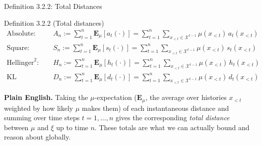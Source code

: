 \documentclass[aspectratio=169,10pt]{beamer}
\newcommand{\X}{\mathcal{X}}
\begin{document}
\begin{frame}{Definition 3.2.2: Total Distances}
  \begin{block}{Definition 3.2.2 (Total distances)}
    \begin{align*}
      \text{Absolute:} \quad & A_n := \sum_{t=1}^{n}\mathbf{E}_\mu[a_t(\cdot)] = \sum_{t=1}^{n}\sum_{x_{<t}\in\X^{t-1}} \mu(x_{<t})\,a_t(x_{<t}) \\
      \text{Square:} \quad & S_n := \sum_{t=1}^{n}\mathbf{E}_\mu[s_t(\cdot)] = \sum_{t=1}^{n}\sum_{x_{<t}\in\X^{t-1}} \mu(x_{<t})\,s_t(x_{<t}) \\
      \text{Hellinger}^2\text{:} \quad & H_n := \sum_{t=1}^{n}\mathbf{E}_\mu[h_t(\cdot)] = \sum_{t=1}^{n}\sum_{x_{<t}\in\X^{t-1}} \mu(x_{<t})\,h_t(x_{<t}) \\
      \text{KL divergence:} \quad & D_n := \sum_{t=1}^{n}\mathbf{E}_\mu[d_t(\cdot)] = \sum_{t=1}^{n}\sum_{x_{<t}\in\X^{t-1}} \mu(x_{<t})\,d_t(x_{<t})
    \end{align*}
  \end{block}
  \textbf{Plain English.} Taking the $\mu$-expectation ($\mathbf{E}_\mu$, the
  average over histories $x_{<t}$ weighted by how likely $\mu$ makes them) of
  each instantaneous distance and summing over time steps $t=1,\dots,n$ gives
  the corresponding \emph{total distance} between $\mu$ and $\xi$ up to time
  $n$. These totals are what we can actually bound and reason about globally.
\end{frame}
\end{document}
